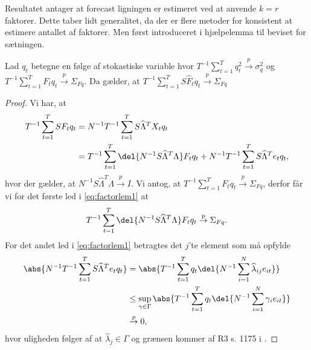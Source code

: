 Resultatet antager at forecast ligningen er estimeret ved at anvende \(k=r\) faktorer.
Dette taber lidt generalitet, da der er flere metoder for konsistent at estimere antallet af faktorer.
Men først introduceret i hjælpelemma til beviset for sætningen.
%
\begin{lem} \label{lem:factorlem1}
Lad \(q_t\) betegne en følge af stokastiske variable hvor \(T^{-1} \sum_{t=1}^T q_t^2 \overset{p}{\rightarrow} \sigma_q^2\) og \(T^{-1} \sum_{t=1}^T F_t q_t \overset{p}{\rightarrow} \Sigma_{Fq}\).
Da gælder, at \(T^{-1} \sum_{t=1}^T S \widehat{F}_t q_t \overset{p}{\rightarrow} \Sigma_{Fq}\)
\end{lem}
%
\begin{proof}
Vi har, at
\begin{align}
T^{-1} \sum_{t=1}^T S F_t q_t &= N^{-1} T^{-1} \sum_{t=1}^T S \widehat{\Lambda}^T X_t q_t \nonumber \\
&= T^{-1} \sum_{t=1}^T \del{N^{-1} S \widehat{\Lambda}^T \Lambda} F_t q_t + N^{-1} T^{-1} \sum_{t=1}^T S \widehat{\Lambda}^T e_t q_t, \label{eq:factorlem1}
\end{align}
hvor der gælder, at \(N^{-1} S \widehat{\Lambda}^T \Lambda \overset{p}{\rightarrow} I\).
Vi antog, at \(T^{-1} \sum_{t=1}^T F_t q_t \overset{p}{\rightarrow} \Sigma_{Fq}\), derfor får vi for det første led i \eqref{eq:factorlem1} at
\begin{align*}
T^{-1} \sum_{t=1}^T \del{N^{-1} S \widehat{\Lambda}^T \Lambda} F_t q_t \overset{p}{\rightarrow} \Sigma_{Fq}.
\end{align*}
For det andet led i \eqref{eq:factorlem1} betragtes det \(j\)'te element som må opfylde
\begin{align*}
\abs{N^{-1} T^{-1} \sum_{t=1}^T S \widehat{\Lambda}^T e_t q_t} &= \abs{T^{-1} \sum_{t=1}^T q_t \del{N^{-1} \sum_{i=1}^N \widehat{\lambda}_{ij} e_{it}}} \\
& \leq \sup_{\gamma \in \Gamma} \abs{T^{-1} \sum_{t=1}^T q_t \del{N^{-1} \sum_{i=1}^N \gamma_i e_{it}}} \\
& \overset{p}{\rightarrow} 0,
\end{align*}
hvor uligheden følger af at \(\widehat{\lambda}_j \in \Gamma\) og grænsen kommer af R3 s. 1175 i \citep{stock_watson_2002a}.
\end{proof}

